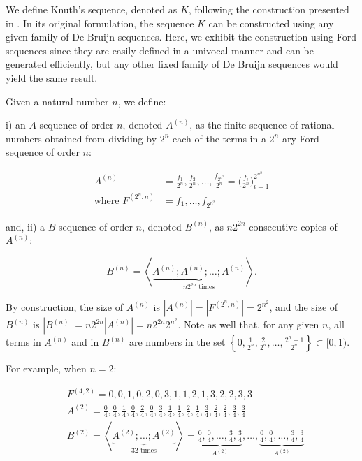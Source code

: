 \documentclass[11pt,a4paper]{tesis}
\theoremstyle{plain}
\theoremstyle{definition}
\begin{document}
We define Knuth's sequence, denoted as $K$, following the construction presented in \cite{knuth-1965}. In its original formulation, the sequence $K$ can be constructed using any given family of De Bruijn sequences. Here, we exhibit the construction using Ford sequences since they are easily defined in a univocal manner and can be generated efficiently, but any other fixed family of De Bruijn sequences would yield the same result.

Given a natural number $n$, we define:

i) an $A$ sequence of order $n$, denoted $A^{(n)}$, as the finite sequence of rational numbers obtained from dividing by $2^n$ each of the terms in a $2^n$-ary Ford sequence of order $n$:

\begin{equation*}
  \begin{aligned}
    A^{(n)} & = \frac{f_1}{2^n}, \frac{f_2}{2^n}, \dots, \frac{f_{2^{n^2}}}{2^n} = \bigg( \frac{f_i}{2^n} \bigg)_{i = 1}^{2^{n^2}} \\
    \text{where } F^{(2^n, n)} & = f_1, \dots, f_{2^{n^2}}
  \end{aligned}
\end{equation*}

and, ii) a $B$ sequence of order $n$, denoted $B^{(n)}$, as $n 2^{2 n}$ consecutive copies of $A^{(n)}$:

\begin{equation*}
  B^{(n)} = \left< \underbrace{A^{(n)} ; A^{(n)} ; \dots ; A^{(n)}}_{n 2^{2 n} \text{ times}} \right> \text{.}
\end{equation*}

By construction, the size of $A^{(n)}$ is $|A^{(n)}| = |F^{(2^n, n)}| = 2^{n^2}$, and the size of $B^{(n)}$ is $|B^{(n)}| = n 2^{2 n} |A^{(n)}| = n 2^{2 n} 2^{n^2}$. Note as well that, for any given $n$, all terms in $A^{(n)}$ and in $B^{(n)}$ are numbers in the set $\left \{ 0, \frac{1}{2^n}, \frac{2}{2^n}, \dots, \frac{2^n - 1}{2^n} \right \} \subset [0, 1)$.

For example, when $n = 2$:

\begin{equation*}
  \begin{aligned}
    & F^{(4, 2)} = 0, 0, 1, 0, 2, 0, 3, 1, 1, 2, 1, 3, 2, 2, 3, 3 \\
    & A^{(2)} = \frac{0}{4}, \frac{0}{4}, \frac{1}{4}, \frac{0}{4}, \frac{2}{4}, \frac{0}{4}, \frac{3}{4}, \frac{1}{4}, \frac{1}{4}, \frac{2}{4}, \frac{1}{4}, \frac{3}{4}, \frac{2}{4}, \frac{2}{4}, \frac{3}{4}, \frac{3}{4} \\
    & B^{(2)} = \left< \underbrace{A^{(2)} ; \dots ; A^{(2)}}_{32 \text{ times}} \right> = \underbrace{\frac{0}{4}, \frac{0}{4}, \dots, \frac{3}{4}, \frac{3}{4}}_{A^{(2)}}, \dots, \underbrace{\frac{0}{4}, \frac{0}{4}, \dots, \frac{3}{4}, \frac{3}{4}}_{A^{(2)}}
  \end{aligned}
\end{equation*}
\end{document}
